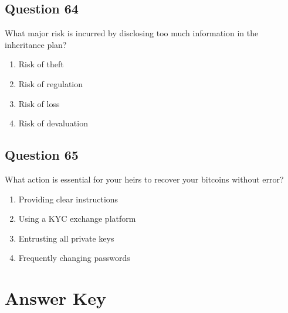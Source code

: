 \documentclass[12pt,a4paper]{article}
\begin{document}
\bigskip


\subsection*{Question 64}
What major risk is incurred by disclosing too much information in the inheritance plan?

\begin{enumerate}[label=\Alph*., leftmargin=*]
\item Risk of theft
\item Risk of regulation
\item Risk of loss
\item Risk of devaluation
\end{enumerate}

\bigskip


\subsection*{Question 65}
What action is essential for your heirs to recover your bitcoins without error?

\begin{enumerate}[label=\Alph*., leftmargin=*]
\item Providing clear instructions
\item Using a KYC exchange platform
\item Entrusting all private keys
\item Frequently changing passwords
\end{enumerate}

\bigskip


\newpage
\section*{Answer Key}
\end{document}
